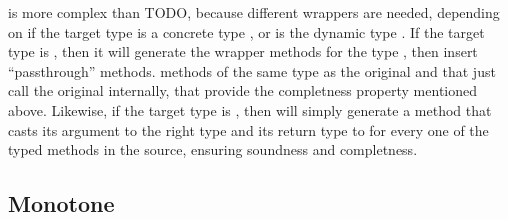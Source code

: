 \documentclass[a4paper,UKenglish,final]{tex/lipics-v2016}
\begin{document}
\wc is more complex than TODO, because different wrappers are needed, depending on if the target type is a concrete type \C, or is the dynamic type \any. If the target type is \C, then it will generate the wrapper methods for the type \C, then insert ``passthrough'' methods. methods of the same type as the original and that just call the original internally, that provide the completness property mentioned above. Likewise, if the target type is \any, then \wc will simply generate a method that casts its argument to the right type and its return type to \any for every one of the typed methods in the source, ensuring soundness and completness.


\subsection{Monotone}






\end{document}

